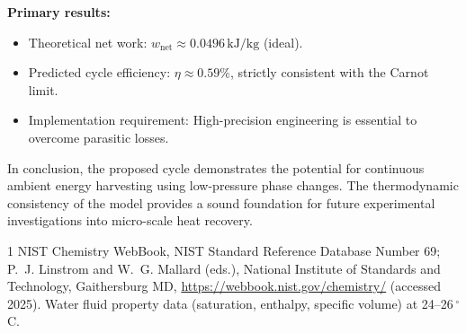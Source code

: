 \documentclass[11pt,a4paper]{article}
\begin{document}
\textbf{Primary results:}
\begin{itemize}
  \item Theoretical net work: $w_{\mathrm{net}} \approx 0.0496\,\mathrm{kJ}/\mathrm{kg}$ (ideal).
  \item Predicted cycle efficiency: $\eta \approx 0.59\%$, strictly consistent with the Carnot limit.
  \item Implementation requirement: High-precision engineering is essential to overcome parasitic losses.
\end{itemize}

In conclusion, the proposed cycle demonstrates the potential for 
continuous ambient energy harvesting using low-pressure phase changes. 
The thermodynamic consistency of the model provides a sound foundation 
for future experimental investigations into micro-scale heat recovery.

\begin{thebibliography}{1}
NIST Chemistry WebBook, NIST Standard Reference Database Number 69; P.~J. Linstrom and W.~G. Mallard (eds.), National Institute of Standards and Technology, Gaithersburg MD, \url{https://webbook.nist.gov/chemistry/} (accessed 2025). Water fluid property data (saturation, enthalpy, specific volume) at 24--26\,$^\circ$C.
\end{thebibliography}
\end{document}
